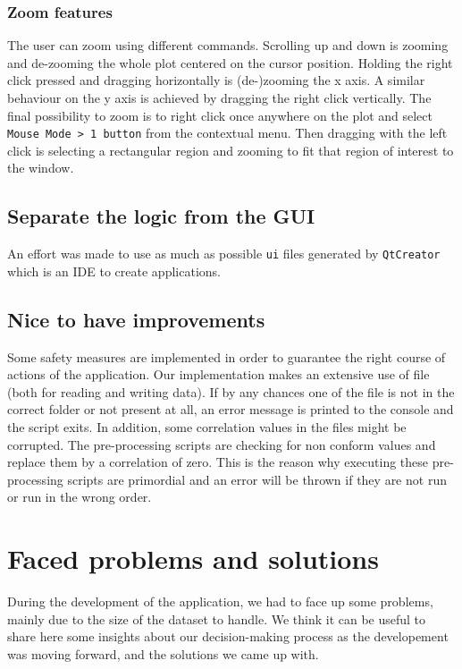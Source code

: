 \documentclass[11pt,a4paper]{article}
\begin{document}
\subsubsection{Zoom features}
The user can zoom using different commands. Scrolling up and down is zooming and de-zooming the whole plot centered on the cursor position. Holding the right click pressed and dragging horizontally is (de-)zooming the x axis. A similar behaviour on the y axis is achieved by dragging the right click vertically. The final possibility to zoom is to right click once anywhere on the plot and select \texttt{Mouse Mode > 1 button} from the contextual menu. Then dragging with the left click is selecting a rectangular region and zooming to fit that region of interest to the window.

\subsection{Separate the logic from the GUI}
An effort was made to use as much as possible \texttt{ui} files generated by \texttt{QtCreator} which is an IDE to create applications. 

\subsection{Nice to have improvements}
Some safety measures are implemented in order to guarantee the right course of actions of the application. Our implementation makes an extensive use of file (both for reading and writing data). If by any chances one of the file is not in the correct folder or not present at all, an error message is printed to the console and the script exits. In addition, some correlation values in the files might be corrupted. The pre-processing scripts are checking for non conform values and replace them by a correlation of zero. This is the reason why executing these pre-processing scripts are primordial and an error will be thrown if they are not run or run in the wrong order. 

\section{Faced problems and solutions}
\label{sec:faced-problems-and-solutions}

During the development of the application, we had to face up some problems, mainly due to the size of the dataset to handle.
We think it can be useful to share here some insights about our decision-making process as the developement was moving forward, and the solutions we came up with.
\end{document}
